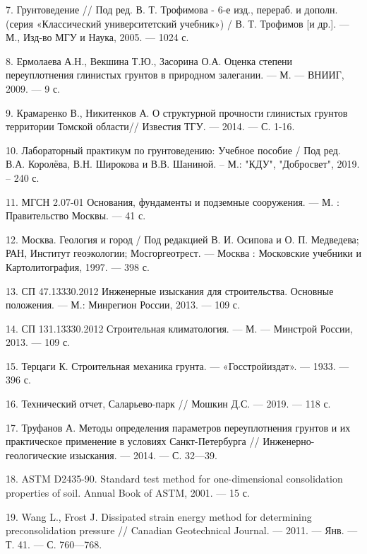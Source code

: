 7. Грунтоведение // Под ред. В. Т. Трофимова - 6-е изд., перераб. и дополн.
(серия «Классический университетский учебник») / В. Т. Трофимов
[и др.]. — М., Изд-во МГУ и Наука, 2005. — 1024 с.

8. Ермолаева А.Н., Векшина Т.Ю., Засорина О.А. Оценка степени переуплотнения 
глинистых грунтов в природном залегании. --- М. --- ВНИИГ, 2009. --- 9 с.

9. Крамаренко В., Никитенков А. О структурной прочности глинистых грунтов
территории Томской области// Известия ТГУ. --- 2014. ---
С. 1-16.

10. Лабораторный практикум по грунтоведению: Учебное пособие / Под ред. В.А. Королёва, 
В.Н. Широкова и В.В. Шаниной. – М.: "КДУ"{}, "Добросвет"{}, 2019. – 240 с.

11. МГСН 2.07-01 Основания, фундаменты и подземные сооружения. --- М. : 
Правительство Москвы. --- 41 с.

12. Москва. Геология и город / Под редакцией В. И. Осипова и О. П. Медведева; 
РАН, Институт геоэкологии; Мосгоргеотрест. --- Москва : Московские учебники 
и Картолитография, 1997. --- 398 с.

13. СП 47.13330.2012 Инженерные изыскания для строительства. 
Основные положения. --- М.: Минрегион России, 2013. --- 109 с.

14. СП 131.13330.2012 Строительная климатология. --- М. --- Минстрой России, 2013. --- 109 с.

15. Терцаги К. Строительная механика грунта. --- «Госстройиздат». ---
1933. --- 396 с.

16. Технический отчет, Саларьево-парк // Мошкин Д.С. --- 2019. --- 118 с.

17. Труфанов А. Методы определения параметров переуплотнения грунтов и
их практическое применение в условиях Санкт-Петербурга // Инженерно-
геологические изыскания. --- 2014. --- С. 32---39.

18. ASTM D2435-90. Standard test method for one-dimensional consolidation 
properties of soil. Annual Book of ASTM, 2001. --- 15 с.

19. Wang L., Frost J. Dissipated strain energy method for determining
preconsolidation pressure // Canadian Geotechnical Journal. — 2011. —
Янв. — Т. 41. — С. 760—768.